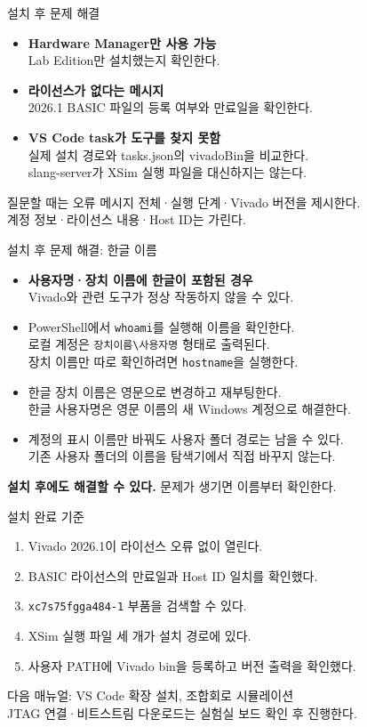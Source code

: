 \documentclass[aspectratio=169,11pt]{beamer}
\begin{document}
\begin{frame}{설치 후 문제 해결}
\begin{itemize}
\item \textbf{Hardware Manager만 사용 가능}\\
Lab Edition만 설치했는지 확인한다.
\item \textbf{라이선스가 없다는 메시지}\\
2026.1 BASIC 파일의 등록 여부와 만료일을 확인한다.
\item \textbf{VS Code task가 도구를 찾지 못함}\\
실제 설치 경로와 tasks.json의 vivadoBin을 비교한다.\\
slang-server가 XSim 실행 파일을 대신하지는 않는다.
\end{itemize}
\vspace{0.25cm}
\small 질문할 때는 오류 메시지 전체·실행 단계·Vivado 버전을 제시한다.\\
계정 정보·라이선스 내용·Host ID는 가린다.
\end{frame}

\begin{frame}{설치 후 문제 해결: 한글 이름}
\begin{itemize}
\item \textbf{사용자명·장치 이름에 한글이 포함된 경우}\\
Vivado와 관련 도구가 정상 작동하지 않을 수 있다.
\item PowerShell에서 \texttt{whoami}를 실행해 이름을 확인한다.\\
로컬 계정은 \texttt{장치이름\textbackslash 사용자명} 형태로 출력된다.\\
장치 이름만 따로 확인하려면 \texttt{hostname}을 실행한다.
\item 한글 장치 이름은 영문으로 변경하고 재부팅한다.\\
한글 사용자명은 영문 이름의 새 Windows 계정으로 해결한다.
\item 계정의 표시 이름만 바꿔도 사용자 폴더 경로는 남을 수 있다.\\
기존 사용자 폴더의 이름을 탐색기에서 직접 바꾸지 않는다.
\end{itemize}
\vspace{0.25cm}
\textbf{설치 후에도 해결할 수 있다.} 문제가 생기면 이름부터 확인한다.
\end{frame}

\begin{frame}{설치 완료 기준}
\begin{enumerate}
\item Vivado 2026.1이 라이선스 오류 없이 열린다.
\item BASIC 라이선스의 만료일과 Host ID 일치를 확인했다.
\item \texttt{xc7s75fgga484-1} 부품을 검색할 수 있다.
\item XSim 실행 파일 세 개가 설치 경로에 있다.
\item 사용자 PATH에 Vivado bin을 등록하고 버전 출력을 확인했다.
\end{enumerate}
\vspace{0.4cm}
다음 매뉴얼: VS Code 확장 설치, 조합회로 시뮬레이션\\
\small JTAG 연결·비트스트림 다운로드는 실험실 보드 확인 후 진행한다.
\end{frame}
\end{document}
